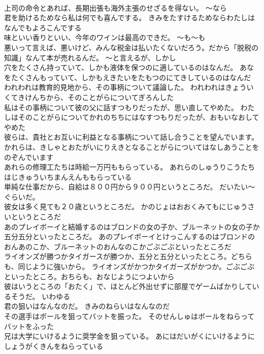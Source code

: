 \documentclass[8pt]{extreport}
\begin{document}
\begin{CJK}{UTF8}{min}
\\	上司の命令とあれば、長期出張も海外主張のせざるを得ない。	～なら
\\	君を助けるためなら私は何でも喜んでする。	きみをたすけるためならわたしはなんでもよろこんでする 
\\	味といい香りといい、今年のワインは最高のできだ。	～も～も
\\	悪いって言えば、悪いけど、みんな税金は払いたくないだろう。だから「脱税の知識」なんて本が売れるんだ。	～と言えるが、しかし
\\	穴をたくさん持っていて、しかも液体を保つのに適しているのはなんだ。	あなをたくさんもっていて、しかもえきたいをたもつのにてきしているのはなんだ 
\\	われわれは教育的見地から、その事柄について議論した。	われわれはきょういくてきけんちから、そのことがらについてぎろんした 
\\	私はその事柄について彼の父に話すつもりだったが、思い直してやめた。	わたしはそのことがらについてかれのちちにはなすつもりだったが、おもいなおしてやめた 
\\	彼らは、貴社とお互いに利益となる事柄について話し合うことを望んでいます。	かれらは、きしゃとおたがいにりえきとなることがらについてはなしあうことをのぞんでいます 
\\	あれらの修理工たちは時給一万円ももらっている。	あれらのしゅうりこうたちはじきゅういちまんえんももらっている 
\\	単純な仕事だから、自給は８００円から９００円というところだ。	だいたい～ぐらいだ。
\\	彼女は多く見ても２０歳というところだ。	かのじょはおおくみてもにじゅうさいというところだ 
\\	あのプレイボーイと結婚するのはブロンドの女の子か、ブルーネットの女の子か五分五分といったところだ。	あのプレイボーイとけっこんするのはブロンドのおんあのこか、ブルーネットのおんなのこかごぶごぶといったところだ 
\\	ライオンズが勝つかタイガースが勝つか、五分と五分といったところ。どちらも、同じように強いから。	ライオンズがかつかタイガーズがかつか。ごぶごぶといったところ。おちらも、おなじようにつよいから 
\\	彼はいうところの「おたく」で、ほとんど外出せずに部屋でゲームばかりしているそうだ。	いわゆる
\\	君の狙いはなんなのだ。	きみのねらいはなんなのだ 
\\	その選手はボールを狙ってバットを振った。	そのせんしゅはボールをねらってバットをふった 
\\	兄は大学にいけるように奨学金を狙っている。	あにはだいがくにいけるようにしょうがくきんをねらっている 

\end{CJK}
\end{document}
